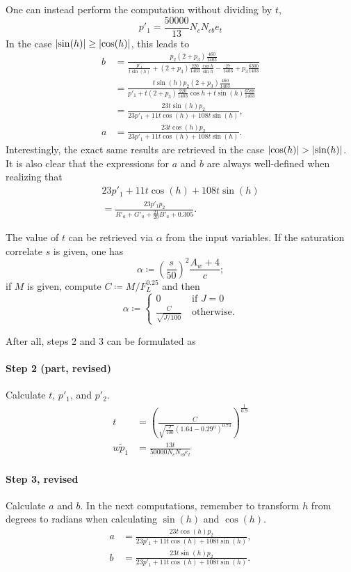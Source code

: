\documentclass[twocolumn]{scrartcl}
\DeclarePairedDelimiter\abs{\lvert}{\rvert}%
\begin{document}
One can instead perform the computation without dividing by $t$,
\[
  p'_1 = \frac{50000}{13} N_c N_{cb} e_t
\]
In the case $\abs{\sin(h)} \ge \abs{\cos(h)}$, this leads to
\begin{align*}
  b &= \frac{p_2 (2+p_3) \frac{460}{1403}}{\frac{p'_1}{t\sin(h)} + (2+p_3) \frac{220}{1403} \frac{\cos h}{\sin h} - \frac{27}{1403} + p_3 \frac{6300}{1403}}\\
   &= \frac{t \sin(h) p_2 (2+p_3) \frac{460}{1403}}{p'_1 + t (2+p_3) \frac{220}{1403} \cos h + t \sin(h) \frac{6588}{1403}}\\
   &= \frac{23 t \sin(h) p_2}{23 p'_1 + 11 t \cos(h) + 108 t \sin(h)},\\
  a &= \frac{23 t \cos(h) p_2}{23 p'_1 + 11 t \cos(h) + 108 t \sin(h)}.
\end{align*}
Interestingly, the exact same results are retrieved in the case $\abs{\cos(h)}
> \abs{\sin(h)}$.
It is also clear that the expressions for $a$ and $b$ are always well-defined
when realizing that
\begin{multline*}
  23 p'_1 + 11 t \cos(h) + 108 t \sin(h)\\
  = \frac{23 p'_1 p_2}{R'_a + G'_a + \tfrac{21}{20}B'_a + 0.305}.
\end{multline*}

The value of $t$ can be retrieved via $\alpha$ from the input variables.
If the saturation correlate $s$ is given, one has
\[
  \alpha \coloneqq {\left(\frac{s}{50}\right)}^2 \frac{A_w+4}{c};
\]
if $M$ is given, compute $C\coloneqq M / F_L^{0.25}$ and then
\[
\alpha\coloneqq\begin{cases}
  0 &\:\text{if $J=0$}\\
  \frac{C}{\sqrt{J/100}}&\:\text{otherwise}.
\end{cases}
\]

After all, steps 2 and 3 can be formulated as
\paragraph{Step 2 (part, revised)}{Calculate $t$, $p'_1$, and $p'_2$.
\begin{align*}
  t &= {\left(\frac{C}{\sqrt{\frac{J}{100}} {(1.64 - 0.29^n)}^{0.73}}\right)}^\frac{1}{0.9}\\w
  \tilde{p}_1 &= \frac{13 t}{50000 N_c N_{cb} e_t}
\end{align*}
}
\paragraph{Step 3, revised}{Calculate $a$ and $b$.
In the next computations, remember to transform $h$ from degrees to radians
when calculating $\sin(h)$ and $\cos(h)$.
\begin{align*}
  a &= \frac{23 t \cos(h) p_2}{23 p'_1 + 11 t \cos(h) + 108 t \sin(h)},\\
  b &= \frac{23 t \sin(h) p_2}{23 p'_1 + 11 t \cos(h) + 108 t \sin(h)}.
\end{align*}}
\end{document}
